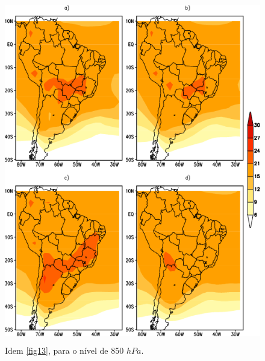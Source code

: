 \begin{figure}[!hbp]
\centering
\includegraphics[height=15cm]{./figs/media_temp_anl_850hPa.png}
\caption{Idem \autoref{fig13}, para o nível de 850 $hPa$.}
\label{fig20}
\end{figure}

